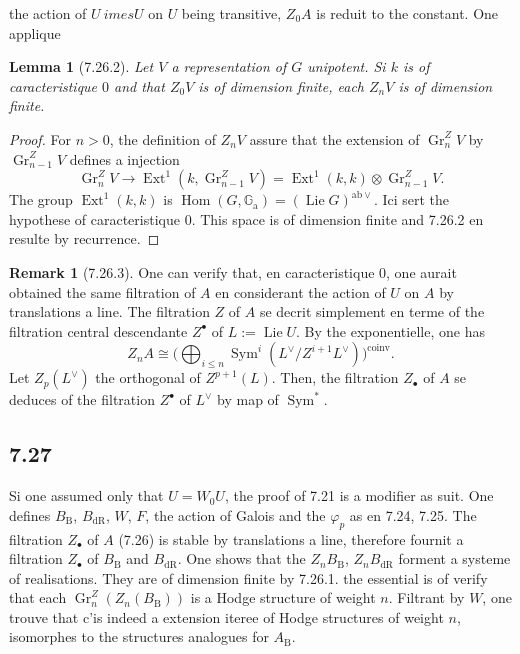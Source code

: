 \documentclass[12pt,a4paper]{article}
\theoremstyle{plain}
\newtheorem{lemma}[theorem]{Lemma}
\theoremstyle{definition}
\newtheorem{remark}[theorem]{Remark}
\theoremstyle{remark}
\DeclareMathOperator{\Hom}{Hom}
\DeclareMathOperator{\Ext}{Ext}
\DeclareMathOperator{\Lie}{Lie}
\DeclareMathOperator{\Gr}{Gr}
\DeclareMathOperator{\Sym}{Sym}
\newcommand{\Ga}{\mathbb{G}_\mathrm{a}}
\newcommand{\DR}{\mathrm{dR}}
\newcommand{\B}{\mathrm{B}}
\begin{document}
the action of $U \	imes U$ on $U$ being transitive, $Z_0A$ is reduit to the constant. One applique

\begin{lemma}[7.26.2]\label{lem:7.26.2}
Let $V$ a representation of $G$ unipotent. Si $k$ is of caracteristique $0$ and that $Z_0V$ is of dimension finite, each $Z_nV$ is of dimension finite.
\end{lemma}

\begin{proof}
For $n > 0$, the definition of $Z_nV$ assure that the extension of $\Gr_n^ZV$ by $\Gr_{n-1}^ZV$ defines a injection
\[
\Gr_n^ZV \longrightarrow \Ext^1(k, \Gr_{n-1}^ZV) = \Ext^1(k,k) \otimes \Gr_{n-1}^ZV.
\]
The group $\Ext^1(k,k)$ is $\Hom(G, \Ga) = (\Lie G)^{\mathrm{ab} \vee}$. Ici sert the hypothese of caracteristique $0$. This space is of dimension finite and 7.26.2 en resulte by recurrence.
\end{proof}

\begin{remark}[7.26.3]\label{rem:7.26.3}
One can verify that, en caracteristique $0$, one aurait obtained the same filtration of $A$ en considerant the action of $U$ on $A$ by translations a line. The filtration $Z$ of $A$ se decrit simplement en terme of the filtration central descendante $Z^\bullet$ of $L := 
\Lie U$. By the exponentielle, one has
\[
Z_nA \cong \bigl(\bigoplus_{i \leq n} 
\Sym^i(L^\vee/Z^{i+1}L^\vee)\bigr)^{\mathrm{coinv}}.
\]
Let $Z_p(L^\vee)$ the orthogonal of $Z^{p+1}(L)$. Then, the filtration $Z_\bullet$ of $A$ se deduces of the filtration $Z^\bullet$ of $L^\vee$ by map of $\Sym^*$.
\end{remark}

\subsection*{7.27}
Si one assumed only that $U = W_0U$, the proof of 7.21 is a modifier as suit. One defines $B_\B$, $B_\DR$, $W$, $F$, the action of Galois and the $\varphi_p$ as en 7.24, 7.25. The filtration $Z_\bullet$ of $A$ (7.26) is stable by translations a line, therefore fournit a filtration $Z_\bullet$ of $B_\B$ and $B_\DR$. One shows that the $Z_nB_\B$, $Z_nB_\DR$ forment a systeme of realisations. They are of dimension finite by 7.26.1. the essential is of verify that each $\Gr_n^Z(Z_n(B_\B))$ is a Hodge structure of weight $n$. Filtrant by $W$, one trouve that c'is indeed a extension iteree of Hodge structures of weight $n$, isomorphes to the structures analogues for $A_\B$.
\end{document}

